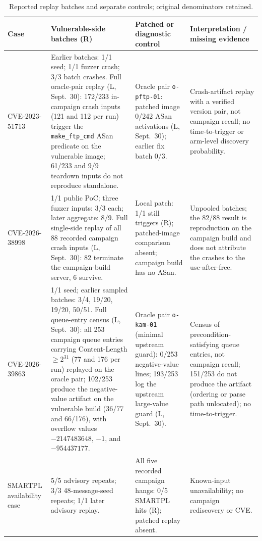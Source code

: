 \documentclass[final,5p,times,number]{elsarticle}
\begin{document}
\begin{table}[!tbp]
\centering\small
\caption{Reported replay batches and separate controls; original denominators retained.}
\label{tab:cveresults}
\begin{tabularx}{\textwidth}{@{}>{\raggedright\arraybackslash}p{} Y Y Y@{}}
\toprule
Case & Vulnerable-side batches (R) & Patched or diagnostic control & Interpretation / missing evidence \\
\midrule
\mbox{CVE-2023-51713} & Earlier batches: 1/1 seed; 1/1 fuzzer crash; 3/3 batch crashes. Full oracle-pair replay (L, Sept.~30): 172/233 in-campaign crash inputs (121 and 112 per run) trigger the \texttt{make\_ftp\_cmd} ASan predicate on the vulnerable image; 61/233 and 9/9 teardown inputs do not reproduce standalone. & Oracle pair \texttt{o-pftp-01}: patched image 0/242 ASan activations (L, Sept.~30); earlier fix batch 0/3. & Crash-artifact replay with a verified version pair, not campaign recall; no time-to-trigger or arm-level discovery probability. \\
\addlinespace[3pt]
\mbox{CVE-2026-38998} & 1/1 public PoC; three fuzzer inputs: 3/3 each; later aggregate: 8/9. Full single-side replay of all 88 recorded campaign crash inputs (L, Sept.~30): 82 terminate the campaign-build server, 6 survive. & Local patch: 1/1 still triggers (R); patched-image comparison absent; campaign build has no ASan. & Unpooled batches; the 82/88 result is reproduction on the campaign build and does not attribute the crashes to the use-after-free. \\
\addlinespace[3pt]
\mbox{CVE-2026-39863} & 1/1 seed; earlier sampled batches: 3/4, 19/20, 19/20, 50/51. Full queue-entry census (L, Sept.~30): all 253 campaign queue entries carrying Content-Length $\geq 2^{31}$ (77 and 176 per run) replayed on the oracle pair; 102/253 produce the negative-value artifact on the vulnerable build (36/77 and 66/176), with overflow values $-2147483648$, $-1$, and $-954437177$. & Oracle pair \texttt{o-kam-01} (minimal upstream guard): 0/253 negative-value lines; 193/253 log the upstream large-value guard (L, Sept.~30). & Census of precondition-satisfying queue entries, not campaign recall; 151/253 do not produce the artifact (ordering or parse path unlocated); no time-to-trigger. \\
\addlinespace[3pt]
SMARTPL availability case & 5/5 advisory repeats; 3/3 48-message-seed repeats; 1/1 later advisory replay. & All five recorded campaign hangs: 0/5 SMARTPL hits (R); patched replay absent. & Known-input unavailability; no campaign rediscovery or CVE. \\
\bottomrule
\end{tabularx}
\end{table}
\end{document}
